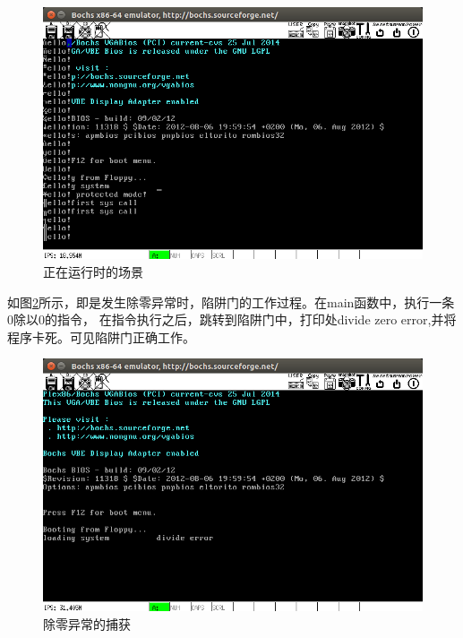 \documentclass[a4paper]{article}
\begin{document}
\begin{figure}[!hbt]
    \begin{center}
    \includegraphics[scale=0.4]{assets/running.png}
    \caption{正在运行时的场景\label{fig:runing}} 
    \end{center} 
\end{figure} 

如图\ref{fig:divideerror}所示，即是发生除零异常时，陷阱门的工作过程。在main函数中，执行一条0除以0的指令，
在指令执行之后，跳转到陷阱门中，打印处divide zero error,并将程序卡死。可见陷阱门正确工作。\\ 

\begin{figure}[!hbt]
    \begin{center}
    \includegraphics[scale=0.4]{assets/divideerror.png}
    \caption{除零异常的捕获\label{fig:divideerror}} 
    \end{center} 
\end{figure} 
\end{document}
